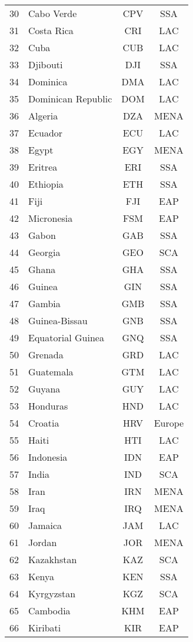 {\begin{longtable}{l l c c}
  30 & Cabo Verde & CPV & SSA \\ 
  31 & Costa Rica & CRI & LAC \\ 
  32 & Cuba & CUB & LAC \\ 
  33 & Djibouti & DJI & SSA \\ 
  34 & Dominica & DMA & LAC \\ 
  35 & Dominican Republic & DOM & LAC \\ 
  36 & Algeria & DZA & MENA \\ 
  37 & Ecuador & ECU & LAC \\ 
  38 & Egypt & EGY & MENA \\ 
  39 & Eritrea & ERI & SSA \\ 
  40 & Ethiopia & ETH & SSA \\ 
  41 & Fiji & FJI & EAP \\ 
  42 & Micronesia & FSM & EAP \\ 
  43 & Gabon & GAB & SSA \\ 
  44 & Georgia & GEO & SCA \\ 
  45 & Ghana & GHA & SSA \\ 
  46 & Guinea & GIN & SSA \\ 
  47 & Gambia & GMB & SSA \\ 
  48 & Guinea-Bissau & GNB & SSA \\ 
  49 & Equatorial Guinea & GNQ & SSA \\ 
  50 & Grenada & GRD & LAC \\ 
  51 & Guatemala & GTM & LAC \\ 
  52 & Guyana & GUY & LAC \\ 
  53 & Honduras & HND & LAC \\ 
  54 & Croatia & HRV & Europe \\ 
  55 & Haiti & HTI & LAC \\ 
  56 & Indonesia & IDN & EAP \\ 
  57 & India & IND & SCA \\ 
  58 & Iran & IRN & MENA \\ 
  59 & Iraq & IRQ & MENA \\ 
  60 & Jamaica & JAM & LAC \\ 
  61 & Jordan & JOR & MENA \\ 
  62 & Kazakhstan & KAZ & SCA \\ 
  63 & Kenya & KEN & SSA \\ 
  64 & Kyrgyzstan & KGZ & SCA \\ 
  65 & Cambodia & KHM & EAP \\ 
  66 & Kiribati & KIR & EAP \\ 

\end{longtable}}
